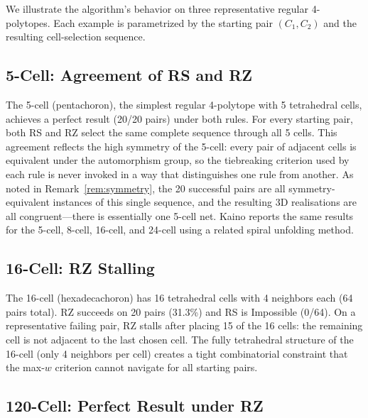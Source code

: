 \documentclass[12pt]{article}
\theoremstyle{definition}
\begin{document}
We illustrate the algorithm's behavior on three representative
regular 4-polytopes.
Each example is parametrized by the starting pair $(C_1, C_2)$
and the resulting cell-selection sequence.

\subsection{5-Cell: Agreement of RS and RZ}
\label{sec:ex-5cell}

The 5-cell (pentachoron), the simplest regular 4-polytope with 5
tetrahedral cells, achieves a perfect result (20/20 pairs) under both
rules.
For every starting pair, both RS and RZ select the same complete
sequence through all 5 cells.
This agreement reflects the high symmetry of the 5-cell:
every pair of adjacent cells is equivalent under the automorphism group,
so the tiebreaking criterion used by each rule is never invoked in a
way that distinguishes one rule from another.
As noted in Remark~\ref{rem:symmetry}, the 20 successful pairs are all
symmetry-equivalent instances of this single sequence, and the resulting
3D realisations are all congruent---there is essentially one 5-cell net.
Kaino \cite{Kaino2019} reports the same results for the 5-cell,
8-cell, 16-cell, and 24-cell using a related spiral unfolding method.

\subsection{16-Cell: RZ Stalling}
\label{sec:ex-16cell}

The 16-cell (hexadecachoron) has 16 tetrahedral cells with 4 neighbors
each (64 pairs total).
RZ succeeds on 20 pairs (31.3\%) and RS is Impossible (0/64).
On a representative failing pair, RZ stalls after placing 15 of the
16 cells: the remaining cell is not adjacent to the last chosen cell.
The fully tetrahedral structure of the 16-cell (only 4 neighbors per
cell) creates a tight combinatorial constraint that the max-$w$
criterion cannot navigate for all starting pairs.

\subsection{120-Cell: Perfect Result under RZ}
\label{sec:ex-120cell}
\end{document}
